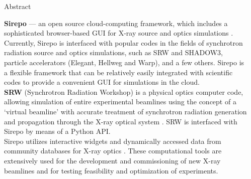 \documentclass[final]{beamer}
\newlength{\sepwid}
\newlength{\onecolwid}
\begin{document}
\begin{frame}[t] %

\begin{columns}[t] %




\begin{column}{\sepwid}\end{column} %
\begin{column}{\onecolwid} %

\begin{block}{\faInfoCircle{} Abstract}

\textbf{Sirepo} --- an open source cloud-computing framework, which includes a
sophisticated browser-based GUI for X-ray source and optics simulations
\cite{Rakitin2018_Sirepo}. Currently, Sirepo is interfaced with popular codes in
the fields of synchrotron radiation source and optics simulations, such as SRW
and SHADOW3, particle accelerators (Elegant, Hellweg and Warp), and a few
others. Sirepo is a flexible framework that can be relatively easily integrated
with scientific codes to provide a convenient GUI for simulations in the cloud.
\newline \\
\textbf{SRW} (Synchrotron Radiation Workshop) is a physical optics computer
code, allowing simulation of entire experimental beamlines using the concept of
a `virtual beamline' with accurate treatment of synchrotron radiation generation
and propagation through the X-ray optical system \cite{Chubar1998_SRW,
Chubar2002_SRW, Chubar2013_SRW}. SRW is interfaced with Sirepo by means of a
Python API.
\newline \\
Sirepo utilizes interactive widgets and dynamically accessed data from community
databases for X-ray optics \cite{henke, stepanov}. These computational tools are
extensively used for the development and commissioning of new X-ray beamlines
and for testing feasibility and optimization of experiments.
\newline \\


\end{block}
\end{column}
\end{columns}
\end{frame}
\end{document}
